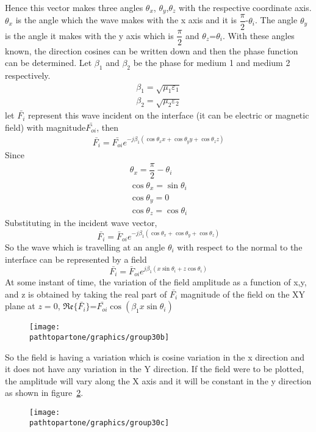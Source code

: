 Hence this vector makes three angles $\theta_x$, $\theta_y$,$\theta_z$ with the respective coordinate axis. $\theta_x$ is the angle which the wave makes with the x axis and it is $\dfrac{\pi}{2}$-$\theta_i$. The angle $\theta_y$ is the angle it makes with the y axis which is $\dfrac{\pi}{2}$ and $\theta_z$=$\theta_i$. With these angles known, the direction cosines can be written down and then the phase function can be determined. Let $\beta_1$ and $\beta_2$ be the phase for medium 1 and medium 2 respectively.
\begin{align*}
\beta_1=\sqrt{\mu_1\varepsilon_1}\\
\beta_2=\sqrt{\mu_2\varepsilon_2}
\end{align*}
let $\bar{F_i}$ represent this wave incident on the interface (it can be electric or magnetic field) with magnitude$\bar{F_{oi}}$, then
\begin{align*}
\bar{F_{i}}=\bar{F_{oi}}e^{-j\beta_1(\cos\theta_xx +\cos\theta_yy+\cos\theta_zz)}
\end{align*}
Since
\begin{align*}
\theta_x=\dfrac{\pi}{2}-\theta_i\\
\cos\theta _x=\sin \theta_i\\
\cos \theta_y=0\\
\cos\theta_z=\cos \theta_i
\end{align*}
Substituting in the incident wave vector,
$$\bar{F_i}=\bar{F}_{oi}e^{-j\beta_1(\cos \theta_x+\cos \theta_y+\cos \theta_z)}$$
So the wave  which is travelling at an angle $\theta_i$ with respect to the normal to the interface can be represented by a field
$$\bar{F_i}=\bar{F}_{oi}e^{j\beta_1(x\sin \theta_i+z\cos \theta_i)} $$
At some instant of time, the variation of the field amplitude as a function of x,y, and z is obtained by taking the real part of $\bar{F_i}$ magnitude of the field on the XY plane at $z=0$, $\mathfrak{Re}\{\bar{F_i}\}$=$\bar{F_{oi}}\cos (\beta_1x\sin \theta_i)$
\begin{figure}[h]
\centering
\texttt{[image: \\pathtopartone/graphics/group30b]}
\caption{}
\label{fig:group30b}
\end{figure}

So the field is having a variation which is cosine variation in the x direction and it does not have any variation in the Y direction. If the field were to be plotted, the amplitude will vary along the X axis and it will be constant in the y direction as shown in figure~\ref{fig:group30c}.
\begin{figure}[h]
\centering
\texttt{[image: \\pathtopartone/graphics/group30c]}
\caption{}
\label{fig:group30c}
\end{figure}

